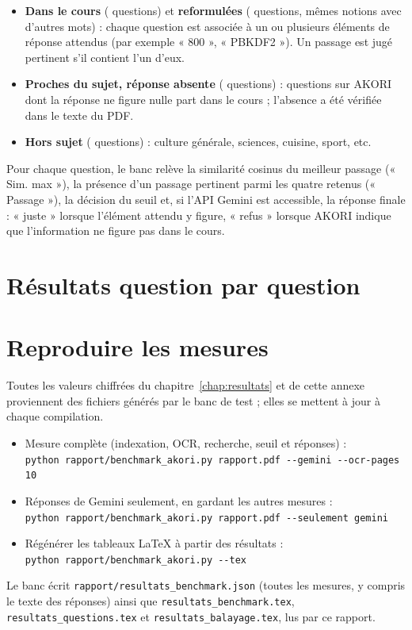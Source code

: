 \documentclass[12pt,a4paper,oneside]{report}
\begin{document}
\begin{itemize}
  \item \textbf{Dans le cours} (\SeuilCoursN{} questions) et \textbf{reformulées} (\SeuilRefoN{} questions, mêmes notions avec d'autres mots) : chaque question est associée à un ou plusieurs éléments de réponse attendus (par exemple « 800 », « PBKDF2 »). Un passage est jugé pertinent s'il contient l'un d'eux.
  \item \textbf{Proches du sujet, réponse absente} (\SeuilAbsN{} questions) : questions sur AKORI dont la réponse ne figure nulle part dans le cours ; l'absence a été vérifiée dans le texte du PDF.
  \item \textbf{Hors sujet} (\SeuilHorsN{} questions) : culture générale, sciences, cuisine, sport, etc.
\end{itemize}

Pour chaque question, le banc relève la similarité cosinus du meilleur passage (« Sim. max »), la présence d'un passage pertinent parmi les quatre retenus (« Passage »), la décision du seuil et, si l'API Gemini est accessible, la réponse finale : « juste » lorsque l'élément attendu y figure, « refus » lorsque AKORI indique que l'information ne figure pas dans le cours.

\clearpage
\section{Résultats question par question}

{\small

}

\section{Reproduire les mesures}

Toutes les valeurs chiffrées du chapitre~\ref{chap:resultats} et de cette annexe proviennent des fichiers générés par le banc de test ; elles se mettent à jour à chaque compilation.

\begin{itemize}
  \item Mesure complète (indexation, OCR, recherche, seuil et réponses) : \\
  \texttt{python rapport/benchmark\_akori.py rapport.pdf -{}-gemini -{}-ocr-pages 10}
  \item Réponses de Gemini seulement, en gardant les autres mesures : \\
  \texttt{python rapport/benchmark\_akori.py rapport.pdf -{}-seulement gemini}
  \item Régénérer les tableaux LaTeX à partir des résultats : \\
  \texttt{python rapport/benchmark\_akori.py -{}-tex}
\end{itemize}

Le banc écrit \texttt{rapport/resultats\_benchmark.json} (toutes les mesures, y compris le texte des réponses) ainsi que \texttt{resultats\_benchmark.tex}, \texttt{resultats\_questions.tex} et \texttt{resultats\_balayage.tex}, lus par ce rapport.
\end{document}
